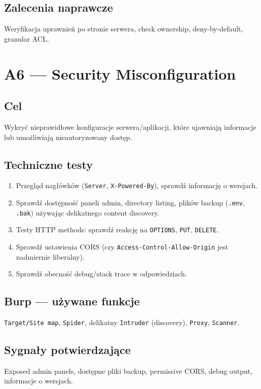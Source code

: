 \documentclass[11pt,a4paper]{article}
\begin{document}
	\subsection*{Zalecenia naprawcze}
	Weryfikacja uprawnień po stronie serwera, check ownership, deny-by-default, granular ACL.
	
	\newpage
	\section{A6 --- Security Misconfiguration}
	\subsection*{Cel}
	Wykryć nieprawidłowe konfiguracje serwera/aplikacji, które ujawniają informacje lub umożliwiają nieautoryzowany dostęp.
	
	\subsection*{Techniczne testy}
	\begin{enumerate}[leftmargin=*,label=\arabic*)]
		\item Przegląd nagłówków (\texttt{Server}, \texttt{X-Powered-By}), sprawdź informację o wersjach.
		\item Sprawdź dostępność paneli admin, directory listing, plików backup (\texttt{.env}, \texttt{.bak}) używając delikatnego content discovery.
		\item Testy HTTP methods: sprawdź reakcję na \texttt{OPTIONS}, \texttt{PUT}, \texttt{DELETE}.
		\item Sprawdź ustawienia CORS (czy \texttt{Access-Control-Allow-Origin} jest nadmiernie liberalny).
		\item Sprawdź obecność debug/stack trace w odpowiedziach.
	\end{enumerate}
	
	\subsection*{Burp --- używane funkcje}
	\texttt{Target/Site map}, \texttt{Spider}, delikatny \texttt{Intruder} (discovery), \texttt{Proxy}, \texttt{Scanner}.
	
	\subsection*{Sygnały potwierdzające}
	Exposed admin panels, dostępne pliki backup, permissive CORS, debug output, informacje o wersjach.
	
\end{document}
